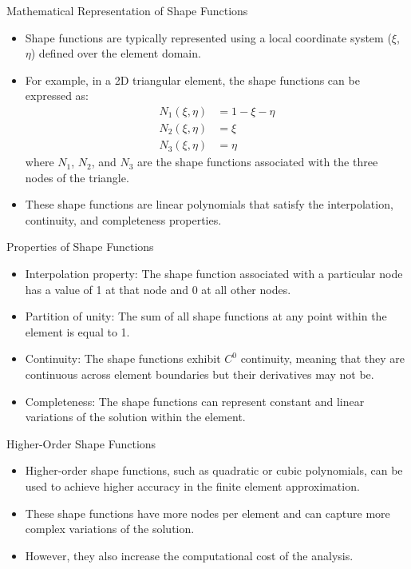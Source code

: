 \documentclass{beamer}
\begin{document}
\begin{frame}{Mathematical Representation of Shape Functions}
    \begin{itemize}
        \item Shape functions are typically represented using a local coordinate system ($\xi$, $\eta$) defined over the element domain.
        \item For example, in a 2D triangular element, the shape functions can be expressed as:
        \begin{align*}
        N_1(\xi, \eta) &= 1 - \xi - \eta \\
        N_2(\xi, \eta) &= \xi \\
        N_3(\xi, \eta) &= \eta
        \end{align*}
        where $N_1$, $N_2$, and $N_3$ are the shape functions associated with the three nodes of the triangle.
        \item These shape functions are linear polynomials that satisfy the interpolation, continuity, and completeness properties.
    \end{itemize}
\end{frame}

\begin{frame}{Properties of Shape Functions}
    \begin{itemize}
        \item Interpolation property: The shape function associated with a particular node has a value of 1 at that node and 0 at all other nodes.
        \item Partition of unity: The sum of all shape functions at any point within the element is equal to 1.
        \item Continuity: The shape functions exhibit $C^0$ continuity, meaning that they are continuous across element boundaries but their derivatives may not be.
        \item Completeness: The shape functions can represent constant and linear variations of the solution within the element.
    \end{itemize}
\end{frame}

\begin{frame}{Higher-Order Shape Functions}
    \begin{itemize}
        \item Higher-order shape functions, such as quadratic or cubic polynomials, can be used to achieve higher accuracy in the finite element approximation.
        \item These shape functions have more nodes per element and can capture more complex variations of the solution.
        \item However, they also increase the computational cost of the analysis.
    \end{itemize}
\end{frame}
\end{document}
